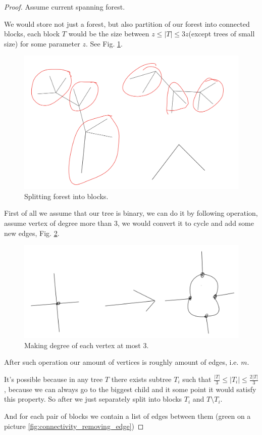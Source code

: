 \begin{proof}
  Assume current spanning forest.

  We would store not just a forest, but also partition of our forest into connected blocks, each block $T$ would be the size between $z \leq |T| \leq 3 z$(except trees of small size) for some parameter $z$. See Fig. \ref{fig:connectivity_m_2_3_blocks}.

\begin{figure}[H]
	\centering
	\includegraphics[width=0.5\linewidth]{figures/connectivity_m_2_3_blocks.jpeg}
	\caption{Splitting forest into blocks.}
	\label{fig:connectivity_m_2_3_blocks}
\end{figure}

First of all we assume that our tree is binary, we can do it by following operation, assume vertex of degree more than 3, we would convert it to cycle and add some new edges, Fig. \ref{fig:connectivity_degree_3}.


\begin{figure}[H]
	\centering
	\includegraphics[width=0.5\linewidth]{figures/connectivity_degree_3.jpeg}
	\caption{Making degree of each vertex at most 3.}
	\label{fig:connectivity_degree_3}
\end{figure}

After such operation our amount of vertices is roughly amount of edges, i.e. $m$.

  It's possible because in any tree $T$ there exists subtree $T_i$ such that $\frac{|T|}{3} \leq |T_i| \leq \frac{2|T|}{3}$, because we can always go to the biggest child and it some point it would satisfy this property. So after we just separately split into blocks $T_i$ and $T \setminus T_i$.

  And for each pair of blocks we contain a list of edges between them (green on a picture \ref{fig:connectivity_removing_edge})


\end{proof}
